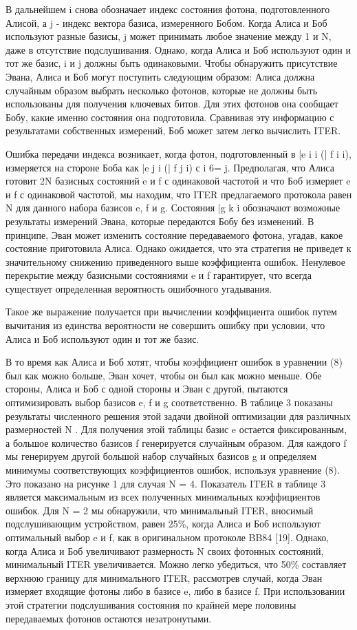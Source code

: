 В дальнейшем i снова обозначает индекс состояния фотона, подготовленного Алисой, а j - индекс вектора базиса, измеренного Бобом. Когда Алиса и Боб используют разные базисы, j может принимать любое значение между 1 и N, даже в отсутствие подслушивания. Однако, когда Алиса и Боб используют один и тот же базис, i и j должны быть одинаковыми. Чтобы обнаружить присутствие Эвана, Алиса и Боб могут поступить следующим образом: Алиса должна случайным образом выбрать несколько фотонов, которые не должны быть использованы для получения ключевых битов. Для этих фотонов она сообщает Бобу, какие именно состояния она подготовила. Сравнивая эту информацию с результатами собственных измерений, Боб может затем легко вычислить ITER.

Ошибка передачи индекса возникает, когда фотон, подготовленный в |e i i (| f i i), измеряется на стороне Боба как |e j i (| f j i) с i 6= j. Предполагая, что Алиса готовит 2N базисных состояний e и f с одинаковой частотой и что Боб измеряет e и f с одинаковой частотой, мы находим, что ITER предлагаемого протокола равен N для данного набора базисов e, f и g. Состояния |g k i обозначают возможные результаты измерений Эвана, которые передаются Бобу без изменений. В принципе, Эван может изменить состояние передаваемого фотона, угадав, какое состояние приготовила Алиса. Однако ожидается, что эта стратегия не приведет к значительному снижению приведенного выше коэффициента ошибок. Ненулевое перекрытие между базисными состояниями e и f гарантирует, что всегда существует определенная вероятность ошибочного угадывания.

Такое же выражение получается при вычислении коэффициента ошибок путем вычитания из единства вероятности не совершить ошибку при условии, что Алиса и Боб используют один и тот же базис.

В то время как Алиса и Боб хотят, чтобы коэффициент ошибок в уравнении (8) был как можно больше, Эван хочет, чтобы он был как можно меньше. Обе стороны, Алиса и Боб с одной стороны и Эван с другой, пытаются оптимизировать выбор базисов e, f и g соответственно. В таблице 3 показаны результаты численного решения этой задачи двойной оптимизации для различных размерностей N . Для получения этой таблицы базис e остается фиксированным, а большое количество базисов f генерируется случайным образом. Для каждого f мы генерируем другой большой набор случайных базисов g и определяем минимумы соответствующих коэффициентов ошибок, используя уравнение (8). Это показано на рисунке 1 для случая N = 4. Показатель ITER в таблице 3 является максимальным из всех полученных минимальных коэффициентов ошибок.
Для N = 2 мы обнаружили, что минимальный ITER, вносимый подслушивающим устройством, равен 25\%, когда Алиса и Боб используют оптимальный выбор e и f, как в оригинальном протоколе BB84 [19]. Однако, когда Алиса и Боб увеличивают размерность N своих фотонных состояний, минимальный ITER увеличивается. Можно легко убедиться, что 50\% составляет верхнюю границу для минимального ITER, рассмотрев случай, когда Эван измеряет входящие фотоны либо в базисе e, либо в базисе f. При использовании этой стратегии подслушивания состояния по крайней мере половины передаваемых фотонов остаются незатронутыми.

